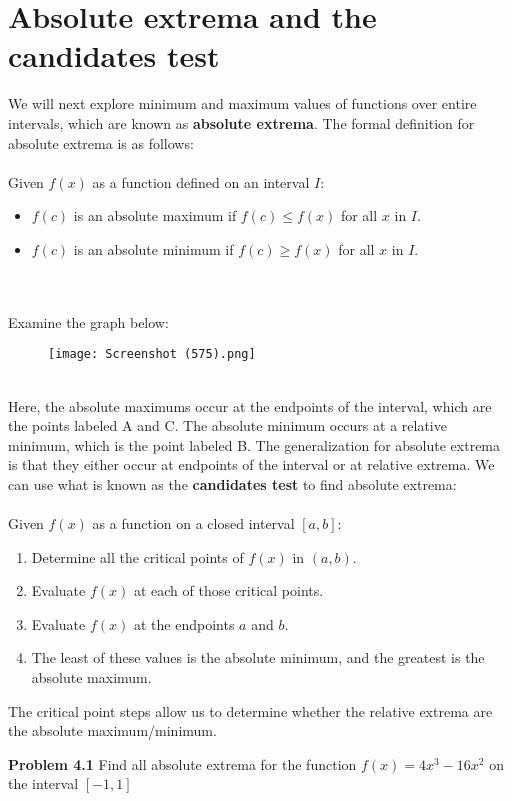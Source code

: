 \documentclass[11pt]{scrartcl}
\begin{document}
\section{Absolute extrema and the candidates test}
\noindent 
We will next explore minimum and maximum values of functions over entire intervals, which are known as \textbf{absolute extrema}. The formal definition for absolute extrema is as follows: \\
\\
\noindent 
Given $f(x)$ as a function defined on an interval $I$:
\newpage
\begin{itemize}
    \item $f(c)$ is an absolute maximum if $f(c)\leq f(x)$ for all $x$ in $I$. 
    \item $f(c)$ is an absolute minimum if $f(c) \geq f(x)$ for all $x$ in $I$. 
\end{itemize} \\
\\
\noindent 
Examine the graph below: 
\begin{figure}[htp]
    \centering
    \texttt{[image: Screenshot (575).png]}
\end{figure}
\\
\noindent
Here, the absolute maximums occur at the endpoints of the interval, which are the points labeled A and C. The absolute minimum occurs at a relative minimum, which is the point labeled B. The generalization for absolute extrema is that they either occur at endpoints of the interval or at relative extrema. We can use what is known as the \textbf{candidates test} to find absolute extrema: \\
\\
\noindent 
Given $f(x)$ as a function on a closed interval $[a,b]$: 
\begin{enumerate}
    \item Determine all the critical points of $f(x)$ in $(a,b)$. 
    \item Evaluate $f(x)$ at each of those critical points.
    \item Evaluate $f(x)$ at the endpoints $a$ and $b$.
    \item The least of these values is the absolute minimum, and the greatest is the absolute maximum. 
\end{enumerate}
\noindent 
The critical point steps allow us to determine whether the relative extrema are the absolute maximum/minimum. 
\begin{tcolorbox}
[colback=purple!5!white,colframe=purple!75!black]
\textbf{Problem 4.1} Find all absolute extrema for the function $f(x)=4x^3-16x^2$ on the interval $[-1,1]$
\end{tcolorbox}
\end{document}
